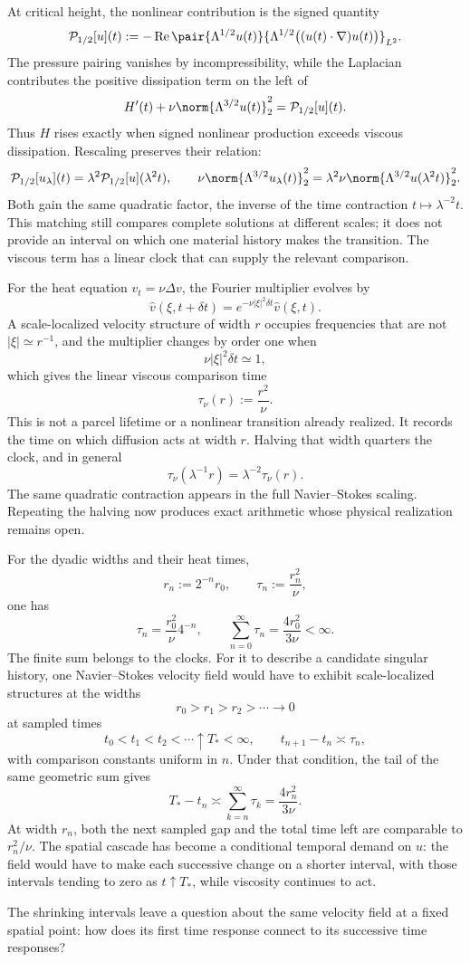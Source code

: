 
At critical height, the nonlinear contribution is the signed quantity
\[
  \mathcal P_{1/2}[u](t)
  :=
  -\operatorname{Re}
  \pair
    {\Lambda^{1/2}u(t)}
    {\Lambda^{1/2}\bigl((u(t)\cdot\nabla)u(t)\bigr)}_{L^2}.
\]
The pressure pairing vanishes by incompressibility, while the Laplacian contributes the positive dissipation term on the left of
\[
  H'(t)
  +
  \nu\norm{\Lambda^{3/2}u(t)}_2^2
  =
  \mathcal P_{1/2}[u](t).
\]
Thus \(H\) rises exactly when signed nonlinear production exceeds viscous dissipation. Rescaling preserves their relation:
\[
  \mathcal P_{1/2}[u_\lambda](t)
  =
  \lambda^2\mathcal P_{1/2}[u](\lambda^2t),
  \qquad
  \nu\norm{\Lambda^{3/2}u_\lambda(t)}_2^2
  =
  \lambda^2\nu\norm{\Lambda^{3/2}u(\lambda^2t)}_2^2.
\]
Both gain the same quadratic factor, the inverse of the time contraction \(t\mapsto\lambda^{-2}t\). This matching still compares complete solutions at different scales; it does not provide an interval on which one material history makes the transition. The viscous term has a linear clock that can supply the relevant comparison.


For the heat equation \(v_t=\nu\Delta v\), the Fourier multiplier evolves by
\[
  \widehat v(\xi,t+\delta t)
  =
  e^{-\nu|\xi|^2\delta t}\widehat v(\xi,t).
\]
A scale-localized velocity structure of width \(r\) occupies frequencies that are not \(|\xi|\simeq r^{-1}\), and the multiplier changes by order one when
\[
  \nu|\xi|^2\delta t\simeq1,
\]
which gives the linear viscous comparison time
\[
  \tau_\nu(r)
  :=
  \frac{r^2}{\nu}.
\]
This is not a parcel lifetime or a nonlinear transition already realized. It records the time on which diffusion acts at width \(r\). Halving that width quarters the clock, and in general
\[
  \tau_\nu(\lambda^{-1}r)
  =
  \lambda^{-2}\tau_\nu(r).
\]
The same quadratic contraction appears in the full Navier--Stokes scaling. Repeating the halving now produces exact arithmetic whose physical realization remains open.


For the dyadic widths and their heat times,
\[
  r_n:=2^{-n}r_0,
  \qquad
  \tau_n:=\frac{r_n^2}{\nu},
\]
one has
\[
  \tau_n
  =
  \frac{r_0^2}{\nu}4^{-n},
  \qquad
  \sum_{n=0}^{\infty}\tau_n
  =
  \frac{4r_0^2}{3\nu}
  <
  \infty.
\]
The finite sum belongs to the clocks. For it to describe a candidate singular history, one Navier--Stokes velocity field would have to exhibit scale-localized structures at the widths
\[
  r_0>r_1>r_2>\cdots\longrightarrow0
\]
at sampled times
\[
  t_0<t_1<t_2<\cdots\uparrow T_*<\infty,
  \qquad
  t_{n+1}-t_n\asymp\tau_n,
\]
with comparison constants uniform in \(n\). Under that condition, the tail of the same geometric sum gives
\[
  T_*-t_n
  \asymp
  \sum_{k=n}^{\infty}\tau_k
  =
  \frac{4r_n^2}{3\nu}.
\]
At width \(r_n\), both the next sampled gap and the total time left are comparable to \(r_n^2/\nu\). The spatial cascade has become a conditional temporal demand on \(u\): the field would have to make each successive change on a shorter interval, with those intervals tending to zero as \(t\uparrow T_*\), while viscosity continues to act.

The shrinking intervals leave a question about the same velocity field at a fixed spatial point: how does its first time response connect to its successive time responses?
